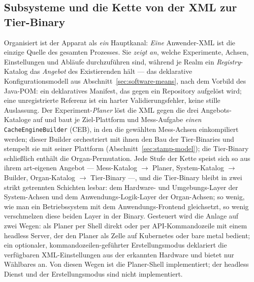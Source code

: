 \begin{nurlang}
\subsection{Subsysteme und die Kette von der XML zur Tier-Binary}\label{sec:mess-chain}
Organisiert ist der Apparat als \emph{ein} Hauptkanal: \emph{Eine} Anwender-XML ist die einzige
Quelle des gesamten Prozesses. Sie \emph{zeigt an}, welche Experimente, Achsen, Einstellungen und
Abläufe durchzuführen sind, während je Realm ein \emph{Registry}-Katalog das \emph{Angebot} des
Existierenden hält --- das deklarative Konfigurationsmodell aus Abschnitt~\ref{sec:software-means},
nach dem Vorbild des Java-POM\@: ein deklaratives Manifest, das gegen ein Repository aufgelöst wird;
eine unregistrierte Referenz ist ein harter Validierungsfehler, keine stille Auslassung. Der
Experiment-\emph{Planer} löst die XML gegen die drei Angebots-Kataloge auf und baut je
Ziel-Plattform und Mess-Aufgabe \emph{einen} \texttt{CacheEngineBuilder} (CEB), in den die gewählten
Mess-Achsen einkompiliert werden; dieser Builder orchestriert mit ihnen den Bau der Tier-Binaries
und stempelt sie mit seiner Plattform (Abschnitt~\ref{sec:stamp-model}); die Tier-Binary
schließlich enthält die Organ-Permutation. Jede Stufe der Kette speist sich so aus ihrem art-eigenen
Angebot --- Mess-Katalog $\to$ Planer, System-Katalog $\to$ Builder, Organ-Katalog $\to$
Tier-Binary ---, und die Tier-Binary bleibt in zwei strikt getrennten Schichten lesbar: dem
Hardware- und Umgebungs-Layer der System-Achsen und dem Anwendungs-Logik-Layer der Organ-Achsen;
so wenig, wie man ein Betriebssystem mit dem Anwendungs-Frontend gleichsetzt, so wenig verschmelzen
diese beiden Layer in der Binary. Gesteuert wird die Anlage auf zwei Wegen: als Planer per Shell direkt
oder per API-Kommandozeile mit einem headless Server, der den Planer als Zelle auf Kubernetes oder bare
metal bedient; ein optionaler, kommandozeilen-geführter Erstellungsmodus deklariert die verfügbaren
XML-Einstellungen aus der erkannten Hardware und bietet nur Wählbares an. Von diesen Wegen ist die
Planer-Shell implementiert; der headless Dienst und der Erstellungsmodus sind nicht implementiert.


\end{nurlang}
